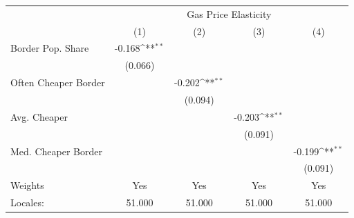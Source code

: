 {
\def\sym#1{\ifmmode^{#1}\else\(^{#1}\)\fi}
\begin{tabular}{l*{4}{c}}
\hline\hline
            &\multicolumn{4}{c}{Gas Price Elasticity}                                               \\
            &\multicolumn{1}{c}{(1)}         &\multicolumn{1}{c}{(2)}         &\multicolumn{1}{c}{(3)}         &\multicolumn{1}{c}{(4)}         \\
\hline
Border Pop. Share&      -0.168\sym{**} &                     &                     &                     \\
            &     (0.066)         &                     &                     &                     \\
[1em]
Often Cheaper Border&                     &      -0.202\sym{**} &                     &                     \\
            &                     &     (0.094)         &                     &                     \\
[1em]
Avg. Cheaper&                     &                     &      -0.203\sym{**} &                     \\
            &                     &                     &     (0.091)         &                     \\
[1em]
Med. Cheaper Border&                     &                     &                     &      -0.199\sym{**} \\
            &                     &                     &                     &     (0.091)         \\
\hline
Weights     &         Yes         &         Yes         &         Yes         &         Yes         \\
Locales:    &      51.000         &      51.000         &      51.000         &      51.000         \\
\hline\hline
\end{tabular}
}
